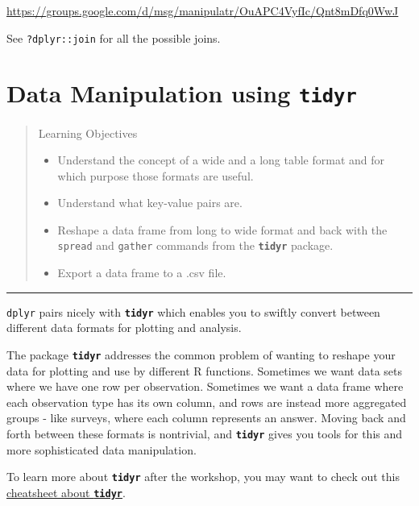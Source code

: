\documentclass[]{book}
\providecommand{\tightlist}{%
  \setlength{\itemsep}{0pt}\setlength{\parskip}{0pt}}
\begin{document}
\url{https://groups.google.com/d/msg/manipulatr/OuAPC4VyfIc/Qnt8mDfq0WwJ}

See \texttt{?dplyr::join} for all the possible joins.

\hypertarget{tidyr}{%
\chapter{\texorpdfstring{Data Manipulation using \textbf{\texttt{tidyr}}}{Data Manipulation using tidyr}}\label{tidyr}}

\begin{quote}
Learning Objectives

\begin{itemize}
\tightlist
\item
  Understand the concept of a wide and a long table format and for which purpose those formats are useful.
\item
  Understand what key-value pairs are.
\item
  Reshape a data frame from long to wide format and back with the \texttt{spread} and \texttt{gather} commands from the \textbf{\texttt{tidyr}} package.
\item
  Export a data frame to a .csv file.
\end{itemize}
\end{quote}

\begin{center}\rule{0.5\linewidth}{\linethickness}\end{center}

\texttt{dplyr} pairs nicely with \textbf{\texttt{tidyr}} which enables you to swiftly convert between different data formats for plotting and analysis.

The package \textbf{\texttt{tidyr}} addresses the common problem of wanting to reshape your data for plotting and use by different R functions. Sometimes we want data sets where we have one row per observation. Sometimes we want a data frame where each observation type has its own column, and rows are instead more aggregated groups - like surveys, where each column represents an answer. Moving back and forth between these formats is nontrivial, and \textbf{\texttt{tidyr}} gives you tools for this and more sophisticated data manipulation.

To learn more about \textbf{\texttt{tidyr}} after the workshop, you may want to check out this \href{https://github.com/rstudio/cheatsheets/raw/master/data-import.pdf}{cheatsheet about \textbf{\texttt{tidyr}}}.
\end{document}
